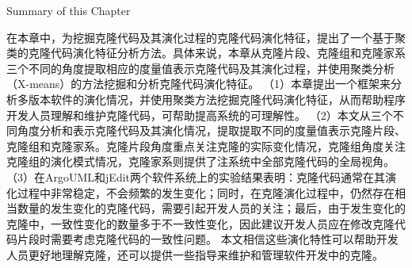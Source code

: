 
 {Summary of  this Chapter}
 
在本章中，为挖掘克隆代码及其演化过程的克隆代码演化特征，提出了一个基于聚类的克隆代码演化特征分析方法。具体来说，本章从克隆片段、克隆组和克隆家系三个不同的角度提取相应的度量值表示克隆代码及其演化过程，并使用聚类分析（X-means）的方法挖掘和分析克隆代码演化特征。
（1）本章提出一个框架来分析多版本软件的演化情况，并使用聚类方法挖掘克隆代码演化特征，从而帮助程序开发人员理解和维护克隆代码，可帮助提高系统的可理解性。
（2）本文从三个不同角度分析和表示克隆代码及其演化情况，提取提取不同的度量值表示克隆片段、克隆组和克隆家系。克隆片段角度重点关注克隆的实际变化情况，克隆组角度关注克隆组的演化模式情况，克隆家系则提供了注系统中全部克隆代码的全局视角。
（3）在ArgoUML和jEdit两个软件系统上的实验结果表明：克隆代码通常在其演化过程中非常稳定，不会频繁的发生变化；同时，在克隆演化过程中，仍然存在相当数量的发生变化的克隆代码，需要引起开发人员的关注；最后，由于发生变化的克隆中，一致性变化的数量多于不一致性变化，因此建议开发人员应在修改克隆代码片段时需要考虑克隆代码的一致性问题。
本文相信这些演化特性可以帮助开发人员更好地理解克隆，还可以提供一些指导来维护和管理软件开发中的克隆。

